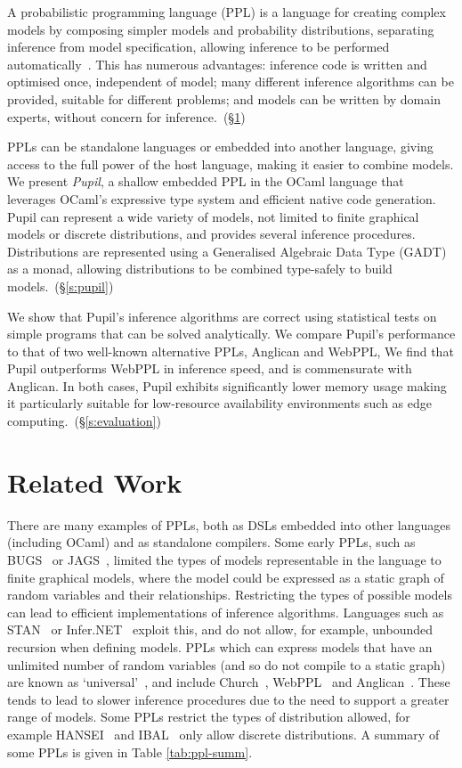 \documentclass[sigconf]{acmart}
\newcommand{\s}[1]{(\S\ref{#1})}
\newcommand{\pupil}{Pupil\xspace}
\begin{document}
A probabilistic programming language (PPL) is a language for creating complex models by composing simpler models and probability distributions, separating inference from model specification, allowing inference to be performed automatically~\cite{gordon2014probabilistic}. This has numerous advantages: inference code is written and optimised once, independent of model; many different inference algorithms can be provided, suitable for different problems; and models can be written by domain experts, without concern for inference.~\s{s:related}

PPLs can be standalone languages or embedded into another language, giving access to the full power of the host language, making it easier to combine models. We present \emph{\pupil}, a shallow embedded PPL in the OCaml language that leverages OCaml's expressive type system and efficient native code generation. \pupil can represent a wide variety of models, not limited to finite graphical models or discrete distributions, and provides several inference procedures. Distributions are represented using a Generalised Algebraic Data Type (GADT) as a monad, allowing distributions to be combined type-safely to build models.~\s{s:pupil}

We show that \pupil's inference algorithms are correct using statistical tests on simple programs that can be solved analytically. We compare \pupil's performance to that of two well-known alternative PPLs, Anglican and WebPPL, We find that \pupil outperforms WebPPL in inference speed, and is commensurate with Anglican. In both cases, \pupil exhibits significantly lower memory usage making it particularly suitable for low-resource availability environments such as edge computing.~\s{s:evaluation}

\section{Related Work}
\label{s:related}

There are many examples of PPLs, both as DSLs embedded into other languages (including OCaml) and as standalone compilers. Some early PPLs, such as BUGS~\cite{gilks1994bugs} or JAGS~\cite{plummer2004jags}, limited the types of models representable in the language to finite graphical models, where the model could be expressed as a static graph of random variables and their relationships. Restricting the types of possible models can lead to efficient implementations of inference algorithms. Languages such as STAN~\cite{carpenter2017stan} or Infer.NET~\cite{wang2011using} exploit this, and do not allow, for example, unbounded recursion when defining models. PPLs which can express models that have an unlimited number of random variables (and so do not compile to a static graph) are known as `universal'~\cite{borgstrom2016lambda}, and include Church~\cite{goodman2012church}, WebPPL~\cite{mobus2018structure} and Anglican~\cite{anglican-smc}. These tends to lead to slower inference procedures due to the need to support a greater range of models. Some PPLs restrict the types of distribution allowed, for example HANSEI~\cite{kiselyov2009embedded} and IBAL~\cite{ibal} only allow discrete distributions. A summary of some PPLs is given in Table \ref{tab:ppl-summ}.
\end{document}
